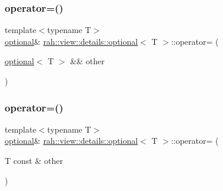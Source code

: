 \subsubsection{\texorpdfstring{operator=()}{operator=()}\hspace{0.1cm}{\footnotesize\ttfamily [2/4]}}
{\footnotesize\ttfamily template$<$typename T$>$ \\
\mbox{\hyperlink{structrah_1_1view_1_1details_1_1optional}{optional}}\& \mbox{\hyperlink{structrah_1_1view_1_1details_1_1optional}{rah\+::view\+::details\+::optional}}$<$ T $>$\+::operator= (\begin{DoxyParamCaption}\item[{\mbox{\hyperlink{structrah_1_1view_1_1details_1_1optional}{optional}}$<$ T $>$ \&\&}]{other }\end{DoxyParamCaption})\hspace{0.3cm}{\ttfamily [inline]}}

\mbox{\label{structrah_1_1view_1_1details_1_1optional_a7e352c56530dfa8c330ac41dae64a270}} 
\subsubsection{\texorpdfstring{operator=()}{operator=()}\hspace{0.1cm}{\footnotesize\ttfamily [3/4]}}
{\footnotesize\ttfamily template$<$typename T$>$ \\
\mbox{\hyperlink{structrah_1_1view_1_1details_1_1optional}{optional}}\& \mbox{\hyperlink{structrah_1_1view_1_1details_1_1optional}{rah\+::view\+::details\+::optional}}$<$ T $>$\+::operator= (\begin{DoxyParamCaption}\item[{T const \&}]{other }\end{DoxyParamCaption})\hspace{0.3cm}{\ttfamily [inline]}}

\mbox{\label{structrah_1_1view_1_1details_1_1optional_a0da71ff4ae436808c2de170250a988bb}} 
